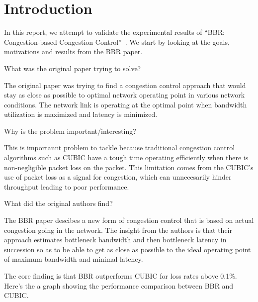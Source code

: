 
\section{Introduction}
In this report, we attempt to validate the experimental results of ``BBR:
Congestion-based Congestion Control''~\cite{cardwell2016bbr}. We start
by looking at the goals, motivations and results from the BBR
\cite{cardwell2016bbr} paper.

What was the original paper trying to solve?

The original paper was trying to find a congestion control approach
that would stay as close as possible to optimal network operating point
in various network conditions. The network link is operating at the optimal
point when bandwidth utilization is maximized and latency is minimized.

Why is the problem important/interesting?

This is importannt problem to tackle because traditional congestion control
algorithms such as CUBIC have a tough time operating efficiently when there
is non-negligible packet loss on the packet. This limitation comes from the
CUBIC's use of packet loss as a signal for congestion, which can unnecesarily
hinder throughput leading to poor performance.


What did the original authors find?

The BBR paper descibes a new form of congestion control that is based on actual
congestion going in the network. The insight from the authors is that their
approach estimates bottleneck bandwidth and then bottleneck latency in succession
so as to be able to get as close as possible to the ideal operating point of
maximum bandwidth and minimal latency.

The core finding is that BBR outperforms CUBIC for loss rates above 0.1\%. Here's
the a graph showing the performance comparison between BBR and CUBIC.
